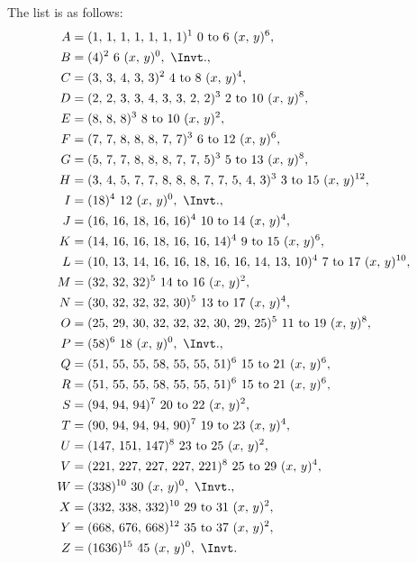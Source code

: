 \documentclass[11pt,a4paper]{book}
\begin{document}
The list is as follows:
\begin{align*}
A &= (1,\, 1,\, 1,\, 1,\, 1,\, 1,\, 1)^{1}\ 0\text{ to }6\ (x,\, y)^{6},\\
B &= (4)^{2}\ 6\ (x,\, y)^{0},\ \Invt.,\\
C &= (3,\, 3,\, 4,\, 3,\, 3)^{2}\ 4\text{ to }8\ (x,\, y)^{4},\\
D &= (2,\, 2,\, 3,\, 3,\, 4,\, 3,\, 3,\, 2,\, 2)^{3}\ 2\text{ to }10\ (x,\, y)^{8},\\
E &= (8,\, 8,\, 8)^{3}\ 8\text{ to }10\ (x,\, y)^{2},\\
F &= (7,\, 7,\, 8,\, 8,\, 8,\, 7,\, 7)^{3}\ 6\text{ to }12\ (x,\, y)^{6},\\
G &= (5,\, 7,\, 7,\, 8,\, 8,\, 8,\, 7,\, 7,\, 5)^{3}\ 5\text{ to }13\ (x,\, y)^{8},\\
H &= (3,\, 4,\, 5,\, 7,\, 7,\, 8,\, 8,\, 8,\, 7,\, 7,\, 5,\, 4,\, 3)^{3}\ 3\text{ to }15\ (x,\, y)^{12},\\
I &= (18)^{4}\ 12\ (x,\, y)^{0},\ \Invt.,\\
J &= (16,\, 16,\, 18,\, 16,\, 16)^{4}\ 10\text{ to }14\ (x,\, y)^{4},\\
K &= (14,\, 16,\, 16,\, 18,\, 16,\, 16,\, 14)^{4}\ 9\text{ to }15\ (x,\, y)^{6},\\
L &= (10,\, 13,\, 14,\, 16,\, 16,\, 18,\, 16,\, 16,\, 14,\, 13,\, 10)^{4}\ 7\text{ to }17\ (x,\, y)^{10},\\
M &= (32,\, 32,\, 32)^{5}\ 14\text{ to }16\ (x,\, y)^{2},\\
N &= (30,\, 32,\, 32,\, 32,\, 30)^{5}\ 13\text{ to }17\ (x,\, y)^{4},\\
O &= (25,\, 29,\, 30,\, 32,\, 32,\, 32,\, 30,\, 29,\, 25)^{5}\ 11\text{ to }19\ (x,\, y)^{8},\\
P &= (58)^{6}\ 18\ (x,\, y)^{0},\ \Invt.,\\
Q &= (51,\, 55,\, 55,\, 58,\, 55,\, 55,\, 51)^{6}\ 15\text{ to }21\ (x,\, y)^{6},\\
R &= (51,\, 55,\, 55,\, 58,\, 55,\, 55,\, 51)^{6}\ 15\text{ to }21\ (x,\, y)^{6},\\
S &= (94,\, 94,\, 94)^{7}\ 20\text{ to }22\ (x,\, y)^{2},\\
T &= (90,\, 94,\, 94,\, 94,\, 90)^{7}\ 19\text{ to }23\ (x,\, y)^{4},\\
U &= (147,\, 151,\, 147)^{8}\ 23\text{ to }25\ (x,\, y)^{2},\\
V &= (221,\, 227,\, 227,\, 227,\, 221)^{8}\ 25\text{ to }29\ (x,\, y)^{4},\\
W &= (338)^{10}\ 30\ (x,\, y)^{0},\ \Invt.,\\
X &= (332,\, 338,\, 332)^{10}\ 29\text{ to }31\ (x,\, y)^{2},\\
Y &= (668,\, 676,\, 668)^{12}\ 35\text{ to }37\ (x,\, y)^{2},\\
Z &= (1636)^{15}\ 45\ (x,\, y)^{0},\ \Invt.
\end{align*}
\end{document}
